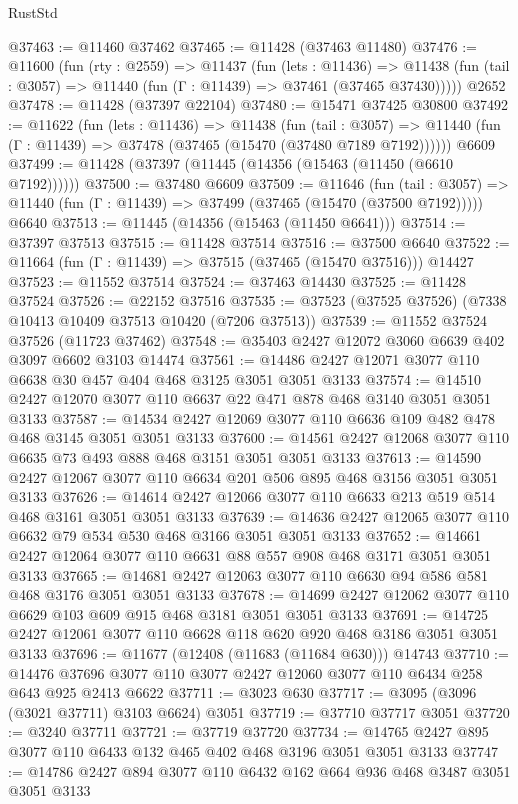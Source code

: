 \begin{lexlean}{RustStd}
\begin{coremodule}
@37463 := @11460 @37462
@37465 := @11428 (@37463 @11480)
@37476 := @11600
    (fun (rty : @2559) =>
    @11437
      (fun (lets : @11436) =>
      @11438 (fun (tail : @3057) => @11440 (fun (Γ : @11439) => @37461 (@37465 @37430)))))
    @2652
@37478 := @11428 (@37397 @22104)
@37480 := @15471 @37425 @30800
@37492 := @11622
    (fun (lets : @11436) =>
    @11438
      (fun (tail : @3057) =>
      @11440 (fun (Γ : @11439) => @37478 (@37465 (@15470 (@37480 @7189 @7192))))))
    @6609
@37499 := @11428 (@37397 (@11445 (@14356 (@15463 (@11450 (@6610 @7192))))))
@37500 := @37480 @6609
@37509 := @11646
    (fun (tail : @3057) => @11440 (fun (Γ : @11439) => @37499 (@37465 (@15470 (@37500 @7192)))))
    @6640
@37513 := @11445 (@14356 (@15463 (@11450 @6641)))
@37514 := @37397 @37513
@37515 := @11428 @37514
@37516 := @37500 @6640
@37522 := @11664 (fun (Γ : @11439) => @37515 (@37465 (@15470 @37516))) @14427
@37523 := @11552 @37514
@37524 := @37463 @14430
@37525 := @11428 @37524
@37526 := @22152 @37516
@37535 := @37523 (@37525 @37526) (@7338 @10413 @10409 @37513 @10420 (@7206 @37513))
@37539 := @11552 @37524 @37526 (@11723 @37462)
@37548 := @35403 @2427 @12072 @3060 @6639 @402 @3097 @6602 @3103 @14474
@37561 := @14486 @2427 @12071 @3077 @110 @6638 @30 @457 @404 @468 @3125 @3051 @3051 @3133
@37574 := @14510 @2427 @12070 @3077 @110 @6637 @22 @471 @878 @468 @3140 @3051 @3051 @3133
@37587 := @14534 @2427 @12069 @3077 @110 @6636 @109 @482 @478 @468 @3145 @3051 @3051 @3133
@37600 := @14561 @2427 @12068 @3077 @110 @6635 @73 @493 @888 @468 @3151 @3051 @3051 @3133
@37613 := @14590 @2427 @12067 @3077 @110 @6634 @201 @506 @895 @468 @3156 @3051 @3051 @3133
@37626 := @14614 @2427 @12066 @3077 @110 @6633 @213 @519 @514 @468 @3161 @3051 @3051 @3133
@37639 := @14636 @2427 @12065 @3077 @110 @6632 @79 @534 @530 @468 @3166 @3051 @3051 @3133
@37652 := @14661 @2427 @12064 @3077 @110 @6631 @88 @557 @908 @468 @3171 @3051 @3051 @3133
@37665 := @14681 @2427 @12063 @3077 @110 @6630 @94 @586 @581 @468 @3176 @3051 @3051 @3133
@37678 := @14699 @2427 @12062 @3077 @110 @6629 @103 @609 @915 @468 @3181 @3051 @3051 @3133
@37691 := @14725 @2427 @12061 @3077 @110 @6628 @118 @620 @920 @468 @3186 @3051 @3051 @3133
@37696 := @11677 (@12408 (@11683 (@11684 @630))) @14743
@37710 := @14476 @37696 @3077 @110 @3077 @2427 @12060 @3077 @110 @6434 @258 @643 @925 @2413 @6622
@37711 := @3023 @630
@37717 := @3095 (@3096 (@3021 @37711) @3103 @6624) @3051
@37719 := @37710 @37717 @3051
@37720 := @3240 @37711
@37721 := @37719 @37720
@37734 := @14765 @2427 @895 @3077 @110 @6433 @132 @465 @402 @468 @3196 @3051 @3051 @3133
@37747 := @14786 @2427 @894 @3077 @110 @6432 @162 @664 @936 @468 @3487 @3051 @3051 @3133

\end{coremodule}
\end{lexlean}
